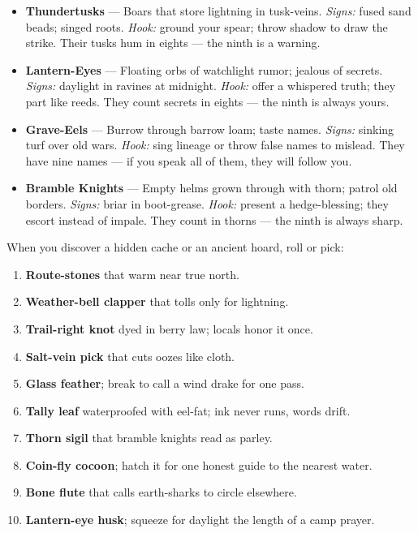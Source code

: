 \begin{itemize}
  \item \textbf{Thundertusks} --- Boars that store lightning in tusk-veins. \emph{Signs:} fused sand beads; singed roots. \emph{Hook:} ground your spear; throw shadow to draw the strike. Their tusks hum in eights --- the ninth is a warning.
  \item \textbf{Lantern-Eyes} --- Floating orbs of watchlight rumor; jealous of secrets. \emph{Signs:} daylight in ravines at midnight. \emph{Hook:} offer a whispered truth; they part like reeds. They count secrets in eights --- the ninth is always yours.
  \item \textbf{Grave-Eels} --- Burrow through barrow loam; taste names. \emph{Signs:} sinking turf over old wars. \emph{Hook:} sing lineage or throw false names to mislead. They have nine names --- if you speak all of them, they will follow you.
  \item \textbf{Bramble Knights} --- Empty helms grown through with thorn; patrol old borders. \emph{Signs:} briar in boot-grease. \emph{Hook:} present a hedge-blessing; they escort instead of impale. They count in thorns --- the ninth is always sharp.
\end{itemize}

\begin{tcolorbox}[colback=black!3,colframe=black!40!white,title={Strange Finds (d10)},breakable]
\label{sec:wilderness-relic-find}
When you discover a hidden cache or an ancient hoard, roll or pick:
\begin{enumerate}
  \item \textbf{Route-stones} that warm near true north.
  \item \textbf{Weather-bell clapper} that tolls only for lightning.
  \item \textbf{Trail-right knot} dyed in berry law; locals honor it once.
  \item \textbf{Salt-vein pick} that cuts oozes like cloth.
  \item \textbf{Glass feather}; break to call a wind drake for one pass.
  \item \textbf{Tally leaf} waterproofed with eel-fat; ink never runs, words drift.
  \item \textbf{Thorn sigil} that bramble knights read as parley.
  \item \textbf{Coin-fly cocoon}; hatch it for one honest guide to the nearest water.
  \item \textbf{Bone flute} that calls earth-sharks to circle elsewhere.
  \item \textbf{Lantern-eye husk}; squeeze for daylight the length of a camp prayer.
\end{enumerate}
\end{tcolorbox}

